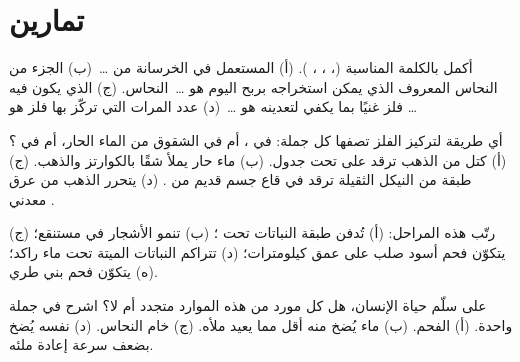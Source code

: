 \section{تمارين}

\begin{exercise}[$\star$]\label{exo:g9:earth-resources:1}
أكمل بالكلمة المناسبة (، ، ، ).
(أ)  المستعمل في الخرسانة من \ldots\ (ب) الجزء من النحاس المعروف
الذي يمكن استخراجه بربح اليوم هو \ldots\ النحاس. (ج)  الذي يكون
فيه فلز غنيًا بما يكفي لتعدينه هو \ldots\ (د) عدد المرات التي تركّز
بها فلز هو \ldots
\end{exercise}

\begin{exercise}[$\star$]\label{exo:g9:earth-resources:2}
أي طريقة لتركيز الفلز تصفها كل جملة: في ، أم في الشقوق من الماء
الحار، أم في  ؟ (أ) كتل من الذهب ترقد على 
تحت  جدول. (ب) ماء حار يملأ شقًا بالكوارتز والذهب. (ج) طبقة من
 النيكل الثقيلة ترقد في قاع جسم قديم من . (د) يتحرر الذهب
من عرق معدني .
\end{exercise}

\begin{exercise}[$\star$]\label{exo:g9:earth-resources:3}
رتّب هذه المراحل: (أ) تُدفن طبقة النباتات تحت  ؛ (ب) تنمو
الأشجار في مستنقع؛ (ج) يتكوّن فحم أسود صلب على عمق كيلومترات؛ (د) تتراكم
النباتات الميتة تحت ماء راكد؛ (ه) يتكوّن فحم بني طري.
\end{exercise}

\begin{exercise}[$\star$]\label{exo:g9:earth-resources:4}
على سلّم حياة الإنسان، هل كل مورد من هذه الموارد متجدد أم لا؟ اشرح في
جملة واحدة. (أ) الفحم. (ب) ماء  يُضخ منه أقل مما يعيد 
ملأه. (ج) خام النحاس. (د)  نفسه يُضخ بضعف سرعة إعادة
ملئه.
\end{exercise}

